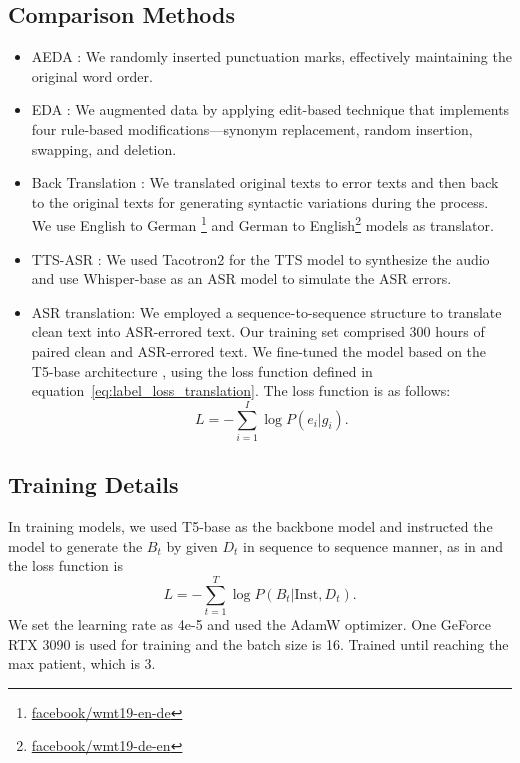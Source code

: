 \subsection{Comparison Methods} 
\label{sec:appendix-experiment-compared-methods}
\begin{itemize}
    \item AEDA \cite{aeda}: We randomly inserted punctuation marks, effectively maintaining the original word order.
    \item EDA \cite{eda}: We augmented data by applying edit-based technique that implements four rule-based modifications—synonym replacement, random insertion, swapping, and deletion.
    \item Back Translation \cite{BT}: We translated original texts to error texts and then back to the original texts for generating syntactic variations during the process. We use English to German \footnote{\url{facebook/wmt19-en-de}} and German to English\footnote{\url{facebook/wmt19-de-en}} models as translator.
    
    
    \item TTS-ASR : We used Tacotron2 \cite{taco} for the TTS model to synthesize the audio and use Whisper-base \cite{whisper} as an ASR model to simulate the ASR errors.

    
    \item ASR translation: We employed a sequence-to-sequence structure to translate clean text into ASR-errored text. Our training set comprised 300 hours of paired clean and ASR-errored text. We fine-tuned the model based on the T5-base architecture \cite{t5}, using the loss function defined in equation~\ref{eq:label_loss_translation}. The loss function is as follows:
    \begin{equation}\label{eq:label_loss_translation}
      L = -\sum_{i=1}^{I} \log P(e_i|g_i).
    \end{equation}

\end{itemize}



\subsection{Training Details}
\label{sec:app-training}
 In training models, we used T5-base \cite{t5} as the backbone model and instructed the model to generate the $B_t$ by given $D_t$ in sequence to sequence manner, as in \cite{pptod} and the loss function is 
    \begin{equation}\label{eq:label_loss}
      L = -\sum_{t=1}^{T} \log P(B_t|\text{Inst}, D_t).
    \end{equation}
We set the learning rate as 4e-5 and used the AdamW \cite{loshchilov2017decoupled} optimizer. One GeForce RTX 3090 is used for training and the batch size is 16. Trained until reaching the max patient, which is 3.




